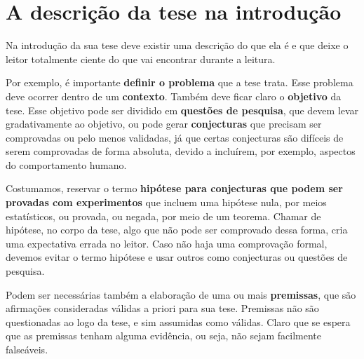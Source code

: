 \section{A descrição da tese na introdução}

Na introdução da sua tese deve existir uma descrição do que ela é e que deixe o leitor totalmente ciente do que vai encontrar durante a leitura.

Por exemplo, é importante \textbf{definir o problema} que a tese trata. Esse problema deve ocorrer dentro de um \textbf{contexto}. Também deve ficar claro o \textbf{objetivo} da tese. Esse objetivo pode ser dividido em \textbf{questões de pesquisa}, que devem levar gradativamente ao objetivo, ou pode gerar \textbf{conjecturas} que precisam ser comprovadas ou pelo menos validadas, já que certas conjecturas são difíceis de serem comprovadas de forma absoluta, devido a incluírem, por exemplo, aspectos do comportamento humano.

Costumamos, reservar o termo \textbf{hipótese para conjecturas que podem ser provadas com experimentos} que incluem uma hipótese nula, por meios estatísticos, ou provada, ou negada, por meio de um teorema. Chamar de hipótese, no corpo da tese, algo que não pode ser comprovado dessa forma, cria uma expectativa errada no leitor. Caso não haja uma comprovação formal, devemos evitar o termo hipótese e usar outros como conjecturas ou questões de pesquisa.

Podem ser necessárias também a elaboração de uma ou mais \textbf{premissas}, que são afirmações consideradas válidas a priori para sua tese. Premissas não são questionadas ao logo da tese, e sim assumidas como válidas. Claro que se espera que as premissas tenham alguma evidência, ou seja, não sejam facilmente falseáveis.


